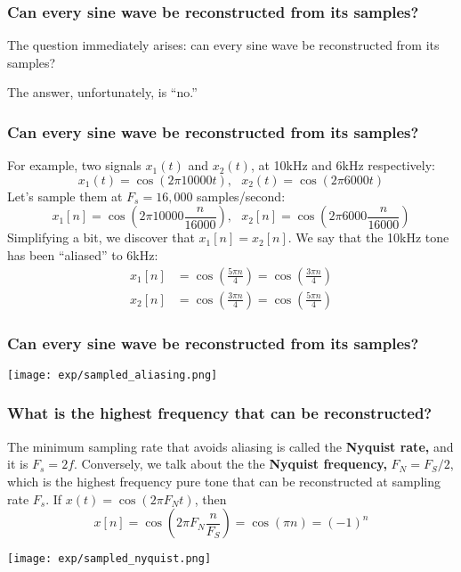 \documentclass{beamer}
\begin{document}
\begin{frame}
  \frametitle{Can every  sine wave be reconstructed from its samples?}

  The question immediately arises: can every sine wave be reconstructed from its samples?

  The answer, unfortunately, is ``no.''
\end{frame}
\begin{frame}
  \frametitle{Can every  sine wave be reconstructed from its samples?}
  
  For example, two signals $x_1(t)$ and $x_2(t)$, at 10kHz and 6kHz respectively:
  \begin{displaymath}
    x_1(t)=\cos(2\pi 10000t),~~~x_2(t)=\cos(2\pi 6000t)
  \end{displaymath}
  Let's sample them at $F_s=16,000$ samples/second:
  \begin{displaymath}
    x_1[n]=\cos\left(2\pi 10000\frac{n}{16000}\right),~~~x_2[n]=\cos\left(2\pi 6000\frac{n}{16000}\right)
  \end{displaymath}
  Simplifying a bit, we discover that $x_1[n]=x_2[n]$.  We say that
  the 10kHz tone has been ``aliased'' to 6kHz:
  \begin{align*}
    x_1[n]&=\cos\left(\frac{5\pi n}{4}\right)=\cos\left(\frac{3\pi n}{4}\right)\\
    x_2[n]&=\cos\left(\frac{3\pi n}{4}\right)=\cos\left(\frac{5\pi n}{4}\right)
  \end{align*}
\end{frame}

\begin{frame}
  \frametitle{Can every  sine wave be reconstructed from its samples?}

  \centerline{\texttt{[image: exp/sampled\_aliasing.png]}}
\end{frame}

\begin{frame}
  \frametitle{What is the highest frequency that can be reconstructed?}

  The minimum sampling rate that avoids aliasing is called the {\bf
    Nyquist rate,} and it is $F_s=2f$.  Conversely, we talk about the
  the {\bf Nyquist frequency,} $F_N=F_S/2$, which is the highest
  frequency pure tone that can be reconstructed at sampling rate
  $F_s$. If $x(t)=\cos(2\pi F_Nt)$, then
  \begin{displaymath}
    x[n]=\cos\left(2\pi F_N\frac{n}{F_S}\right)=\cos(\pi n)=(-1)^n
  \end{displaymath}

  \centerline{\texttt{[image: exp/sampled\_nyquist.png]}}
\end{frame}
\end{document}
